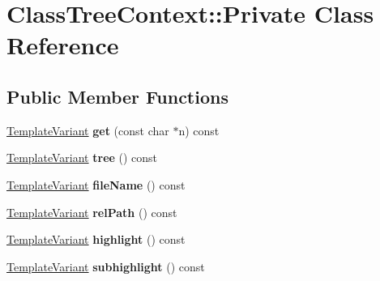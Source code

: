 \hypertarget{class_class_tree_context_1_1_private}{}\section{Class\+Tree\+Context\+::Private Class Reference}
\label{class_class_tree_context_1_1_private}
\subsection*{Public Member Functions}
\begin{DoxyCompactItemize}
\item 
\mbox{\label{class_class_tree_context_1_1_private_ad6cbd402cac0463cc6474de50308e38d}} 
\mbox{\hyperlink{class_template_variant}{Template\+Variant}} {\bfseries get} (const char $\ast$n) const
\item 
\mbox{\label{class_class_tree_context_1_1_private_ac625452d981ffa6ee3f8f5ba7b607cb7}} 
\mbox{\hyperlink{class_template_variant}{Template\+Variant}} {\bfseries tree} () const
\item 
\mbox{\label{class_class_tree_context_1_1_private_a8c8137364f956541ab71e10a2686284f}} 
\mbox{\hyperlink{class_template_variant}{Template\+Variant}} {\bfseries file\+Name} () const
\item 
\mbox{\label{class_class_tree_context_1_1_private_a9ea33dc88ae37b86be73f57b9906fbf4}} 
\mbox{\hyperlink{class_template_variant}{Template\+Variant}} {\bfseries rel\+Path} () const
\item 
\mbox{\label{class_class_tree_context_1_1_private_a098920ecd21249034bcb5d5927c5781b}} 
\mbox{\hyperlink{class_template_variant}{Template\+Variant}} {\bfseries highlight} () const
\item 
\mbox{\label{class_class_tree_context_1_1_private_adfe330a1bebe4fa76e2d804b38f5eb9e}} 
\mbox{\hyperlink{class_template_variant}{Template\+Variant}} {\bfseries subhighlight} () const
\item 
\mbox{\label{class_class_tree_context_1_1_private_a91f0c7a2c2ef789be152ce1126bc1cee}} 

\end{DoxyCompactItemize}
